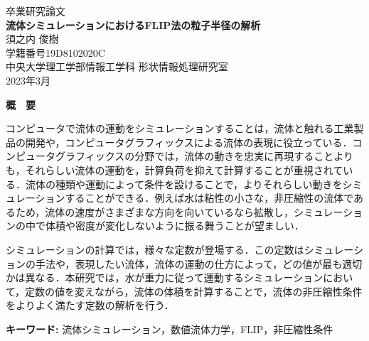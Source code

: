 \documentclass[a4j,12pt]{jreport}
\begin{document}
\thispagestyle{empty}
\begin{center}
\begin{Large}
\vspace*{0.7cm}
{\large 卒業研究論文}\\
\vspace*{2.5cm}
{\bf 流体シミュレーションにおけるFLIP法の粒子半径の解析}\\
\vspace*{7.5cm}
須之内 俊樹\\
学籍番号\hspace*{1zw}19D8102020C\\
\vspace*{2.5cm}
中央大学理工学部情報工学科\hspace*{1zw} 形状情報処理研究室\\
\vspace*{3.0cm}
2023年3月\\
\end{Large}
\end{center}


\newpage
\renewcommand{\baselinestretch}{1.25} \selectfont
{}


\begin{center} {\large \bf{概　要}} \end{center}

コンピュータで流体の運動をシミュレーションすることは，流体と触れる工業製品の開発や，コンピュータグラフィックスによる流体の表現に役立っている．コンピュータグラフィックスの分野では，流体の動きを忠実に再現することよりも，それらしい流体の運動を，計算負荷を抑えて計算することが重視されている．流体の種類や運動によって条件を設けることで，よりそれらしい動きをシミュレーションすることができる．例えば水は粘性の小さな，非圧縮性の流体であるため，流体の速度がさまざまな方向を向いているなら拡散し，シミュレーションの中で体積や密度が変化しないように振る舞うことが望ましい．

シミュレーションの計算では，様々な定数が登場する．この定数はシミュレーションの手法や，表現したい流体，流体の運動の仕方によって，どの値が最も適切かは異なる．本研究では，水が重力に従って運動するシミュレーションにおいて，定数の値を変えながら，流体の体積を計算することで，流体の非圧縮性条件をよりよく満たす定数の解析を行う．

\vspace{1zw} \noindent
{\bf キーワード: }流体シミュレーション，数値流体力学，FLIP，非圧縮性条件
\end{document}
